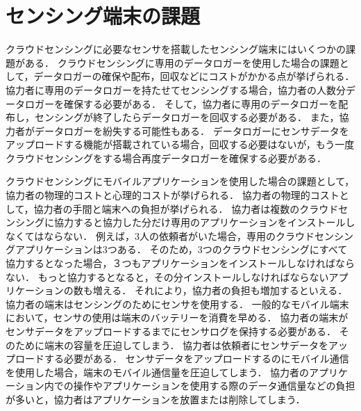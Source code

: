 
\section{センシング端末の課題}

クラウドセンシングに必要なセンサを搭載したセンシング端末にはいくつかの課題がある．
クラウドセンシングに専用のデータロガーを使用した場合の課題として，データロガーの確保や配布，回収などにコストがかかる点が挙げられる．
協力者に専用のデータロガーを持たせてセンシングする場合，協力者の人数分データロガーを確保する必要がある．
そして，協力者に専用のデータロガーを配布し，センシングが終了したらデータロガーを回収する必要がある．
また，協力者がデータロガーを紛失する可能性もある．
データロガーにセンサデータをアップロードする機能が搭載されている場合，回収する必要はないが，もう一度クラウドセンシングをする場合再度データロガーを確保する必要がある．

クラウドセンシングにモバイルアプリケーションを使用した場合の課題として，協力者の物理的コストと心理的コストが挙げられる．
協力者の物理的コストとして，協力者の手間と端末への負担が挙げられる．
協力者は複数のクラウドセンシングに協力すると協力した分だけ専用のアプリケーションをインストールしなくてはならない．
例えば，3人の依頼者がいた場合，専用のクラウドセンシングアプリケーションは3つある．
そのため，3つのクラウドセンシングにすべて協力するとなった場合，３つもアプリケーションをインストールしなければならない．
もっと協力するとなると，その分インストールしなければならないアプリケーションの数も増える．
それにより，協力者の負担も増加するといえる．
協力者の端末はセンシングのためにセンサを使用する．
一般的なモバイル端末において，センサの使用は端末のバッテリーを消費を早める．
協力者の端末がセンサデータをアップロードするまでにセンサログを保持する必要がある．
そのために端末の容量を圧迫してしまう．
協力者は依頼者にセンサデータをアップロードする必要がある．
センサデータをアップロードするのにモバイル通信を使用した場合，端末のモバイル通信量を圧迫してしまう．
協力者のアプリケーション内での操作やアプリケーションを使用する際のデータ通信量などの負担が多いと，協力者はアプリケーションを放置または削除してしまう．

